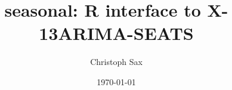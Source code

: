 \documentclass[a4paper, 10pt]{article}
\begin{document}
\title{\textbf{seasonal}: R interface to X-13ARIMA-SEATS}

\author{Christoph Sax}

\date{\today}
\maketitle



\end{document}
